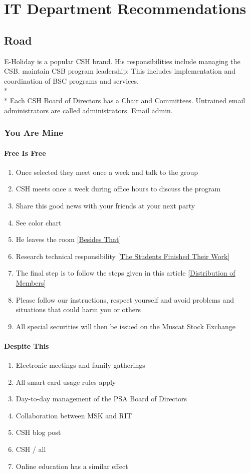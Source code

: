 \documentclass{article}
\newcommand{\article}[1]{\section{#1} \label{#1}}
\newcommand{\asection}[1]{\subsection{#1} \label{#1}}
\newcommand{\asubsection}[1]{\subsubsection{#1} \label{#1}}
\newcommand{\asubsubsection}[1]{\paragraph{#1} \label{#1}}
\begin{document}
\article{IT Department Recommendations}

\asection{Road}
E-Holiday is a popular CSH brand.
His responsibilities include managing the CSB. maintain CSB program leadership; This includes implementation and coordination of BSC programs and services.
\\*\\*
Each CSH Board of Directors has a Chair and Committees.
Untrained email administrators are called administrators. Email admin. %

\asubsection{You Are Mine}
\renewcommand{\theenumi}{\alph{enumi}} %

\asubsubsection{Free Is Free}
\renewcommand{\theenumi}{\arabic{enumi}} %
\begin{enumerate}
	\item Once selected they meet once a week and talk to the group
	\item CSH meets once a week during office hours to discuss the program
	\item Share this good news with your friends at your next party
	\item See color chart
	\item He leaves the room \ref{Besides That}
	\item Research technical responsibility \ref{The Students Finished Their Work}
	\item The final step is to follow the steps given in this article \ref{Distribution of Members}
	\item Please follow our instructions, respect yourself and avoid problems and situations that could harm you or others
	\item All special securities will then be issued on the Muscat Stock Exchange
\end{enumerate}

\asubsubsection{Despite This}
\begin{enumerate}
	\item Electronic meetings and family gatherings
	\item All smart card usage rules apply
	\item Day-to-day management of the PSA Board of Directors
	\item Collaboration between MSK and RIT
	\item CSH blog post
	\item CSH / all
	\item Online education has a similar effect
\end{enumerate}
\end{document}
